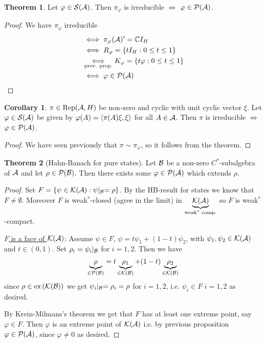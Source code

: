 \documentclass[10pt,english,a4paper]{article}
\theoremstyle{definition}
\newtheorem*{theorem}{Theorem}
\newtheorem*{corollary}{Corollary}
\def\ex{\textnormal{ex}\,}
\def\pivp{\pi_{\vphi}}
\DeclareMathOperator{\Rep}{Rep}
\def\vphi{\varphi}
\begin{document}
\begin{theorem}
    Let $\vphi \in \Ss(\As)$. Then $\pivp$ is irreducible 
$\iff$ $\vphi \in \Ps(\As)$.
\end{theorem}
\begin{proof}
    We have $\pivp$ irreducible 
\begin{align*}
    &\iff \pivp(\As)' = \C I_H \\
    &\iff R_{\vphi}= \{ tI_H : 0\leq t\leq 1 \}\\
    &\underset{\text{prev. prop.}}{\iff} K_{\vphi}=\{t\vphi : 0 \leq t \leq 1\}\\
&\iff \vphi \in \Ps(\As)
\end{align*}
\end{proof}

\begin{corollary}
$\pi \in \Rep(\As,H)$ be non-zero and cyclic with unit cyclic vector $\xi$. 
Let $\vphi \in \Ss(\As)$ be given by $\vphi(A) = \ind{\pi(A)\xi,\xi}$ for all 
$A\in\mathcal{A}$. Then $\pi$ is irreducible $\iff$ $\vphi \in \Ps(\As)$.    
\end{corollary}
\begin{proof}
    We have seen previously that $\pi\sim \pivp$, so it follows from the theorem. 
\end{proof}

\begin{theorem}[Hahn-Banach for pure states]
    Let $\mathcal{B}$ be a non-zero $C^*$-subalgebra of $\mathcal{A}$
and let $\rho \in \mathcal{P}(\mathcal{B})$. Then there exists some $\vphi \in \Ps(\As)$
which extends $\rho$.
\end{theorem}
\begin{proof}
    Set $F = \{\psi \in \mathcal{K}(\mathcal{A}) : \psi\lvert_{\mathcal{B}} = \rho\}$. 
By the HB-result for states we know that $F\neq \emptyset$.
Moreover $F$ is weak$^*$-closed (agree in the limit) in $\underbrace{\mathcal{K}(\mathcal{A})}_{\text{weak$^*$ comp.}}$
so $F$ is weak$^*$-compact. 

\ul{$F$ is a face of $\mathcal{K}(\mathcal{A})$}:
Assume $\psi \in F$, $\psi = t \psi_1 + (1-t)\psi_2$, with $\psi_1,\psi_2\in \mathcal{K}(\mathcal{A})$
and $t\in (0,1)$. 
Set $\rho_{i} = \psi_{i}\lvert_{\mathcal{B}}$ for $i=1,2$.
Then we have 
\[ \underbrace{\rho}_{\in \mathcal{P}(\mathcal{B})} = t\underbrace{\rho_1}_{\in \mathcal{K}(\mathcal{B})} + (1-t)\underbrace{\rho_{2}}_{\in \mathcal{K}(\mathcal{B})} \]
since $\rho \in \ex(\Ks(\Bs))$ we get $\psi_{i}\lvert_{\mathcal{B}}=\rho_i = \rho$ for $i=1,2$,
i.e. $\psi_i \in F$ $i=1,2$ as desired.

By Krein-Milmans's theorem we get that $F$ has at least one extreme point, say
$\vphi\in F$. Then $\vphi$ is an extreme point of $\mathcal{K}(\mathcal{A})$ i.e. by previous
proposition $\vphi\in \Ps(\As)$, since $\vphi\neq 0$ as desired.
\end{proof}
\end{document}
